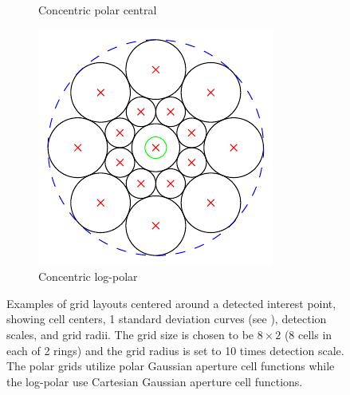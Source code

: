 \documentclass[thesis.tex]{subfiles}
\begin{document}
\begin{figure}[p]
\begin{subfigure}[t]{0.30\textwidth}
		\caption{\footnotesize Concentric polar central}
		\label{fig:gridTypeCpc}
	\end{subfigure}
	\begin{subfigure}[t]{0.30\textwidth}
		\includegraphics[width=\textwidth]{img/gridType_concentric_log-polar.pdf}
		\caption{Concentric log-polar}
		\label{fig:gridTypeClp}
	\end{subfigure}
	\caption{Examples of grid layouts centered around a detected interest point, showing cell centers, 1 standard deviation curves (see ), detection scales, and grid radii. The grid size is chosen to be $8 \times 2$ (8 cells in each of 2 rings) and the grid radius is set to 10 times detection scale. The polar grids utilize polar Gaussian aperture cell functions while the log-polar use Cartesian Gaussian aperture cell functions.}
	\label{fig:gridType}
\end{figure}
%
\end{document}
